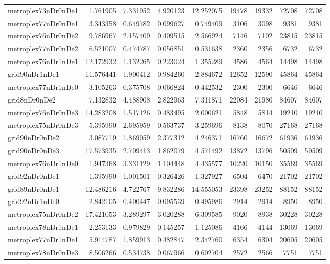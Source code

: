 \begin{longtable}{|l|r|r|r|r|r|r|r|r|}
metroplex73nDr0nDe1 & 1.761905 & 7.331952 & 4.920123 & 12.252075 & 19478 & 19332 & 72708 & 72708 \\
metroplex77nDr0nDe1 & 3.343358 & 0.649782 & 0.099627 & 0.749409 & 3106 & 3098 & 9381 & 9381 \\
metroplex76nDr0nDe2 & 9.786967 & 2.157409 & 0.409515 & 2.566924 & 7146 & 7102 & 23815 & 23815 \\
metroplex77nDr0nDe2 & 6.521007 & 0.474787 & 0.056851 & 0.531638 & 2360 & 2356 & 6732 & 6732 \\
metroplex76nDr1nDe1 & 12.172932 & 1.132265 & 0.223024 & 1.355289 & 4586 & 4564 & 14498 & 14498 \\
grid90nDr1nDe1 & 11.576441 & 1.900412 & 0.984260 & 2.884672 & 12652 & 12590 & 45864 & 45864 \\
metroplex77nDr1nDe0 & 3.105263 & 0.375708 & 0.066824 & 0.442532 & 2300 & 2300 & 6646 & 6646 \\
grid8nDr0nDe2 & 7.132832 & 4.488908 & 2.822963 & 7.311871 & 22084 & 21980 & 84607 & 84607 \\
metroplex76nDr0nDe3 & 14.283208 & 1.517126 & 0.483495 & 2.000621 & 5848 & 5814 & 19210 & 19210 \\
metroplex75nDr0nDe3 & 5.395990 & 2.695959 & 0.563737 & 3.259696 & 8138 & 8070 & 27168 & 27168 \\
grid90nDr0nDe2 & 3.087719 & 1.869059 & 2.377312 & 4.246371 & 16760 & 16672 & 61936 & 61936 \\
grid90nDr0nDe3 & 17.573935 & 2.709413 & 1.862079 & 4.571492 & 13872 & 13796 & 50509 & 50509 \\
metroplex76nDr1nDe0 & 1.947368 & 3.331129 & 1.104448 & 4.435577 & 10220 & 10150 & 35569 & 35569 \\
grid92nDr0nDe1 & 1.395990 & 1.001501 & 0.326426 & 1.327927 & 6504 & 6470 & 21702 & 21702 \\
grid89nDr0nDe1 & 12.486216 & 4.722767 & 9.832286 & 14.555053 & 23398 & 23252 & 88152 & 88152 \\
grid92nDr1nDe0 & 2.842105 & 0.400447 & 0.095539 & 0.495986 & 2914 & 2914 & 8950 & 8950 \\
metroplex75nDr0nDe2 & 17.421053 & 3.289297 & 3.020288 & 6.309585 & 9020 & 8938 & 30228 & 30228 \\
metroplex78nDr1nDe1 & 2.253133 & 0.979829 & 0.145257 & 1.125086 & 4166 & 4144 & 13069 & 13069 \\
metroplex77nDr1nDe1 & 5.914787 & 1.859913 & 0.482847 & 2.342760 & 6354 & 6304 & 20605 & 20605 \\
metroplex78nDr0nDe3 & 8.506266 & 0.534738 & 0.067966 & 0.602704 & 2572 & 2566 & 7751 & 7751 \\

\end{longtable}
